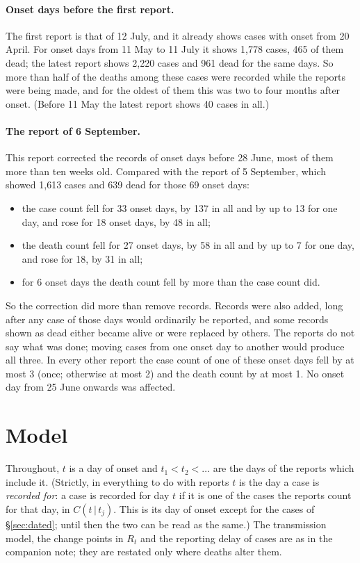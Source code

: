 \documentclass[11pt,a4paper]{article}
\newcommand{\given}{\,|\,}
\begin{document}
\paragraph{Onset days before the first report.} The first report is that of
12 July, and it already shows cases with onset from 20 April. For onset days
from 11 May to 11 July it shows 1{,}778 cases, 465 of them dead; the latest
report shows 2{,}220 cases and 961 dead for the same days. So more than half
of the deaths among these cases were recorded while the reports were being
made, and for the oldest of them this was two to four months after onset.
(Before 11 May the latest report shows 40 cases in all.)

\paragraph{The report of 6 September.} This report corrected the records of
onset days before 28 June, most of them more than ten weeks old. Compared
with the report of 5 September, which showed 1{,}613 cases and 639 dead for
those 69 onset days:
\begin{itemize}
\item the case count fell for 33 onset days, by 137 in all and by up to 13
for one day, and rose for 18 onset days, by 48 in all;
\item the death count fell for 27 onset days, by 58 in all and by up to 7
for one day, and rose for 18, by 31 in all;
\item for 6 onset days the death count fell by more than the case count did.
\end{itemize}
So the correction did more than remove records. Records were also added,
long after any case of those days would ordinarily be reported, and some
records shown as dead either became alive or were replaced by others. The
reports do not say what was done; moving cases from one onset day to
another would produce all three. In every other report the case count of
one of these onset days fell by at most 3 (once; otherwise at most 2) and
the death count by at most 1. No onset day from 25 June onwards was
affected.

\section{Model}\label{sec:model}

Throughout, $t$ is a day of onset and $t_1<t_2<\dots$ are the days of the
reports which include it. (Strictly, in everything to do with reports $t$ is
the day a case is \emph{recorded for}: a case is recorded for day $t$ if it
is one of the cases the reports count for that day, in $C(t\given t_j)$.
This is its day of onset except for the cases of \S\ref{sec:dated}; until
then the two can be read as the same.) The transmission model, the change points in $R_t$
and the reporting delay of cases are as in the companion note; they are
restated only where deaths alter them.
\end{document}

